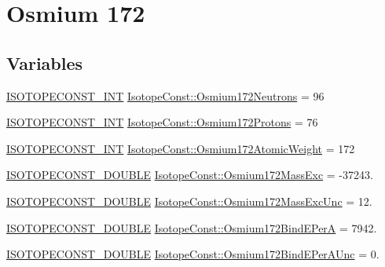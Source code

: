 \hypertarget{group___isotope_const-_osmium-_os172}{}\section{Osmium 172}
\label{group___isotope_const-_osmium-_os172}
\subsection*{Variables}
\begin{DoxyCompactItemize}
\item 
\mbox{\hyperlink{group___isotope_const-_macros_ga5f18360b3e99483a35c32d789e62621c}{I\+S\+O\+T\+O\+P\+E\+C\+O\+N\+S\+T\+\_\+\+I\+NT}} \mbox{\hyperlink{group___isotope_const-_osmium-_os172_gadf8f76ece29f61449b9cf19982bde7fa}{Isotope\+Const\+::\+Osmium172\+Neutrons}} = 96
\item 
\mbox{\hyperlink{group___isotope_const-_macros_ga5f18360b3e99483a35c32d789e62621c}{I\+S\+O\+T\+O\+P\+E\+C\+O\+N\+S\+T\+\_\+\+I\+NT}} \mbox{\hyperlink{group___isotope_const-_osmium-_os172_ga3b424a7ad3a1ddae351e7b7c3385c0c3}{Isotope\+Const\+::\+Osmium172\+Protons}} = 76
\item 
\mbox{\hyperlink{group___isotope_const-_macros_ga5f18360b3e99483a35c32d789e62621c}{I\+S\+O\+T\+O\+P\+E\+C\+O\+N\+S\+T\+\_\+\+I\+NT}} \mbox{\hyperlink{group___isotope_const-_osmium-_os172_ga369a8a8b37d947ae9ab9cb286583839e}{Isotope\+Const\+::\+Osmium172\+Atomic\+Weight}} = 172
\item 
\mbox{\hyperlink{group___isotope_const-_macros_ga8f45a7272ce02c0b4c65c44636ed719a}{I\+S\+O\+T\+O\+P\+E\+C\+O\+N\+S\+T\+\_\+\+D\+O\+U\+B\+LE}} \mbox{\hyperlink{group___isotope_const-_osmium-_os172_ga413586fa48d9415c2a27f331ef1e5e4d}{Isotope\+Const\+::\+Osmium172\+Mass\+Exc}} = -\/37243.
\item 
\mbox{\hyperlink{group___isotope_const-_macros_ga8f45a7272ce02c0b4c65c44636ed719a}{I\+S\+O\+T\+O\+P\+E\+C\+O\+N\+S\+T\+\_\+\+D\+O\+U\+B\+LE}} \mbox{\hyperlink{group___isotope_const-_osmium-_os172_gad5ff8c127d2d7942b991e241ebb14b02}{Isotope\+Const\+::\+Osmium172\+Mass\+Exc\+Unc}} = 12.
\item 
\mbox{\hyperlink{group___isotope_const-_macros_ga8f45a7272ce02c0b4c65c44636ed719a}{I\+S\+O\+T\+O\+P\+E\+C\+O\+N\+S\+T\+\_\+\+D\+O\+U\+B\+LE}} \mbox{\hyperlink{group___isotope_const-_osmium-_os172_ga5547b88e3f58c922e01306ac568c1b73}{Isotope\+Const\+::\+Osmium172\+Bind\+E\+PerA}} = 7942.
\item 
\mbox{\hyperlink{group___isotope_const-_macros_ga8f45a7272ce02c0b4c65c44636ed719a}{I\+S\+O\+T\+O\+P\+E\+C\+O\+N\+S\+T\+\_\+\+D\+O\+U\+B\+LE}} \mbox{\hyperlink{group___isotope_const-_osmium-_os172_ga84b7f563babc7db775189a444dbc7159}{Isotope\+Const\+::\+Osmium172\+Bind\+E\+Per\+A\+Unc}} = 0.

\end{DoxyCompactItemize}
